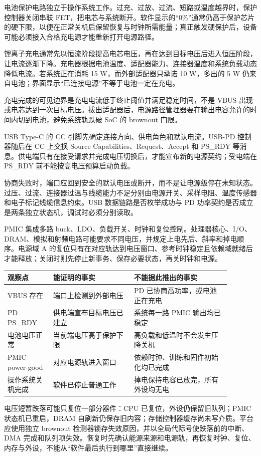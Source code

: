 电池保护电路独立于操作系统工作。过充、过放、过流、短路或温度越界时，保护控制器关闭串联 FET，把电芯与系统断开。软件显示的“0\%”通常仍高于保护芯片的硬下限，以便在正常关机后保留恢复与时钟所需能量；真正触发硬保护后，设备可能必须接入合格充电源才能重新打开电源路径。


锂离子充电通常先以恒流阶段提高电芯电压，再在达到目标电压后进入恒压阶段，让电流逐渐下降。充电器根据电池温度、适配器能力、连接器温度和系统负载动态降低电流。若系统正在消耗 15 W，而外部适配器只承诺 10 W，多出的 5 W 仍来自电池；界面显示“已连接电源”不等于电池一定在充电。

充电完成的可见边界是充电电流低于终止阈值并满足稳定时间，不是 VBUS 出现或电芯达到一次目标电压。拔出适配器后，电源路径管理器要在输出电容允许的时间内切到电池，避免系统轨跌破 SoC 的 brownout 门限。


USB Type-C 的 CC 引脚先确定连接方向、供电角色和默认电流。USB-PD 控制器随后在 CC 上交换 Source Capabilities、Request、Accept 和 PS\_RDY 等消息。供电端只有在接受请求并完成电压切换后，才能宣布新的电源契约；受电端在 PS\_RDY 前不能按高电压预算启动负载。

协商失败时，端口应回到安全的默认电压或断开，而不是让电源级停在未知状态。过压、过流、连接器过温与线缆能力不足分别由电源开关、采样电阻、温度传感器和电子标记线缆信息约束。USB 数据链路是否枚举成功与 PD 功率契约是否成立是两条独立状态机，调试时必须分别读取。


PMIC 集成多路 buck、LDO、负载开关、时钟和复位控制。处理器核心、I/O、DRAM、模拟和射频电路可能要求不同电压，并规定上电先后、斜率和掉电顺序。电源域 A 的复位只有在对应轨达到电压窗口、参考时钟稳定且依赖域就绪后才能释放；关闭时则先停止新事务、保存必要状态，再关时钟和电源。

\begin{longtable}{L{0.18\linewidth}L{0.32\linewidth}L{0.38\linewidth}}
\toprule
观察点 & 能证明的事实 & 不能据此推出的事实 \\
\midrule
VBUS 存在 & 端口上检测到外部电压 & PD 已协商高功率，或电池正在充电 \\\tablerowrule
PD PS\_RDY & 供电端宣布目标电压已建立 & 系统每一路 PMIC 输出均已稳定 \\\tablerowrule
电池电压正常 & 当前端电压高于保护下限 & 高负载和低温时不会发生压降关机 \\\tablerowrule
PMIC power-good & 对应电源轨进入窗口 & 依赖时钟、训练和固件初始化均已完成 \\\tablerowrule
操作系统关机完成 & 软件已停止普通工作 & 掉电保持电容已放完，所有外设均无电 \\
\bottomrule
\end{longtable}


电压短暂跌落可能只复位一部分器件：CPU 已复位，外设仍保留旧队列；PMIC 状态机已重启，DRAM 自刷新仍保存旧内容；存储控制器缓存尚未写介质。平台应使用独立 brownout 检测器锁存失效原因，并以全局代际号使跌落前的中断、DMA 完成和队列项失效。恢复时先确认能源来源和电源轨，再恢复时钟、复位、内存与外设，不能从“软件最后执行到哪里”直接继续。
